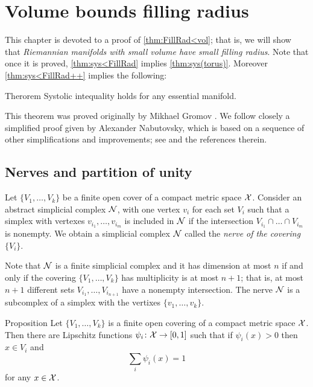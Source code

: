 \chapter{Volume bounds filling radius}

This chapter 
is devoted to a proof of \ref{thm:FillRad<vol};
that is, we will show that \emph{Riemannian manifolds with small volume have small filling radius}.
Note that once it is proved, \ref{thm:sys<FillRad} implies \ref{thm:sys(torus)}.
Moreover \ref{thm:sys<FillRad++} implies the following:

\begin{thm}{Therorem}\label{thm:sys(torus)}
Systolic intequality holds for any essential manifold. 
\end{thm}

This theorem was proved originally by Mikhael Gromov \cite{gromov-1983}.
We follow closely a simplified proof given by Alexander Nabutovsky, which is based on a sequence of other simplifications and improvements; see \cite{nabutovsky} and the references therein.

\section{Nerves and partition of unity}

Let $\{V_1,\dots,V_k\}$ be a finite open cover of a compact metric space $\mathcal{X}$.
Consider an abstract simplicial complex $\mathcal{N}$, with one vertex $v_i$ for each set $V_i$ such that a simplex with vertexes $v_{i_1},\dots, v_{i_m}$ is included in $\mathcal{N}$ if 
the intersection $V_{i_1}\cap\dots\cap V_{i_m}$ is nonempty.
We obtain a simplicial complex $\mathcal{N}$ called the \emph{nerve of the covering $\{V_i\}$}.

Note that $\mathcal{N}$ is a finite simplicial complex and it has dimension at most $n$ if and only if the covering $\{V_1,\dots,V_k\}$ has multiplicity is at most $n+1$;
that is, at most $n+1$ different sets $V_{i_1},\dots, V_{i_{n+1}}$ have a nonempty intersection.
The nerve $\mathcal{N}$ is a subcomplex of a simplex with the vertixes $\{v_1,\dots,v_k\}$.

\begin{thm}{Proposition}\label{thm:part-unit}
 Let $\{V_1,\dots,V_k\}$ is a finite open covering of a compact metric space ${\mathcal{X}}$.
Then there are Lipschitz functions $\psi_i\colon{\mathcal{X}}\to[0,1]$ such that
if $\psi_i(x)>0$ then $x\in V_i$ and
$$\sum_i\psi_i(x)=1$$
for any $x\in {\mathcal{X}}$.
\end{thm}

